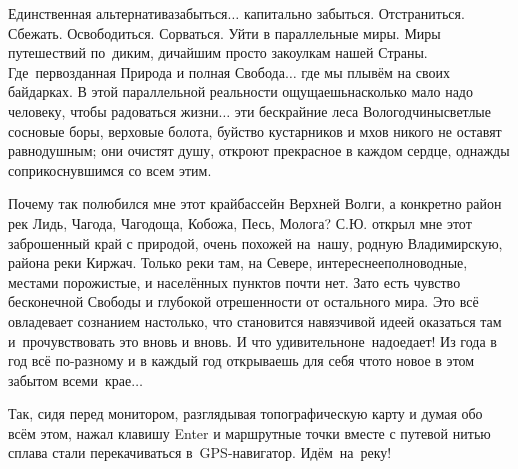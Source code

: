 
Единственная альтернатива\mdash забыться$\ldots$ капитально забыться. Отстраниться. Сбежать. Освободиться. Сорваться. Уйти в параллельные миры. Миры путешествий по~диким, дичайшим просто закоулкам нашей Страны. Где~первозданная Природа и полная Свобода$\ldots$ где мы плывём на своих байдарках. В этой параллельной реальности ощущаешь\mdash насколько мало надо человеку, чтобы радоваться жизни$\ldots$ эти бескрайние леса Вологодчины\mdash светлые сосновые боры, верховые болота, буйство кустарников и мхов никого не оставят равнодушным; они очистят душу, откроют прекрасное в каждом сердце, однажды соприкоснувшимся со всем этим. 

Почему так полюбился мне этот край\mdash бассейн Верхней Волги, а конкретно район рек Лидь, Чагода, Чагодоща, Кобожа, Песь, Молога? С.Ю. открыл мне этот заброшенный край с природой, очень похожей на~нашу, родную Владимирскую, района реки Киржач. Только реки там, на Севере, интереснее\mdash полноводные, местами порожистые, и населённых пунктов почти нет. Зато есть чувство бесконечной Свободы и глубокой отрешенности от остального мира. Это всё овладевает сознанием настолько, что становится навязчивой идеей оказаться там и~прочувствовать это вновь и вновь. И что удивительно\mdash не~надоедает! Из года в год всё по-разному и в каждый год открываешь для себя что\sdash то новое в этом забытом всеми~крае$\ldots$
 
Так, сидя перед монитором, разглядывая топографическую карту и думая обо всём этом, 
нажал клавишу Enter и маршрутные точки вместе с путевой нитью сплава стали перекачиваться в~GPS-навигатор. Идём~на~реку!%

\begin{center}
\end{center}
